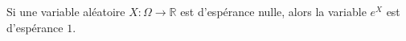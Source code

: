 Si une variable aléatoire $X : \Omega \to \mathbb{R}$ est d'espérance nulle, alors la variable $e^X$ est d'espérance $1$.

\begin{reponses}
\end{reponses}

